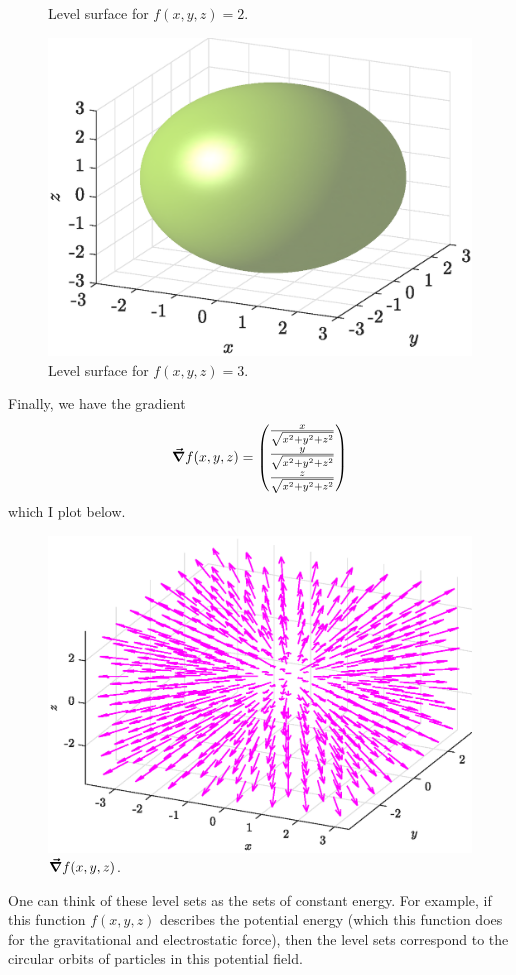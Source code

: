 \documentclass[12pt]{article} %
\begin{document}
\begin{solution}
\begin{enumerate}[(a)]
\begin{figure}[H]
        \caption{Level surface for $f(x,y,z)=2$.}
    \end{figure}
    \begin{figure}[H]
        \centering
        \includegraphics[width=.65\textwidth]{figures/7c_3}
        \caption{Level surface for $f(x,y,z)=3$.}
    \end{figure}

    Finally, we have the gradient
    \[
    \boldsymbol{\vec{\nabla}} f(x,y,z) = \begin{pmatrix} \frac{x}{\sqrt{x^2+y^2+z^2}} \\ \frac{y}{\sqrt{x^2+y^2+z^2}} \\ \frac{z}{\sqrt{x^2+y^2+z^2}} \end{pmatrix}
    \]
    which I plot below.

    \begin{figure}[H]
        \centering
        \includegraphics[width=.65\textwidth]{figures/7c_gradient}
        \caption{$\boldsymbol{\vec{\nabla}} f(x,y,z)$.}
    \end{figure}
\end{enumerate}
One can think of these level sets as the sets of constant energy. For example, if this function $f(x,y,z)$ describes the potential energy (which this function does for the gravitational and electrostatic force), then the level sets correspond to the circular orbits of particles in this potential field.
\end{solution}
\end{document}
